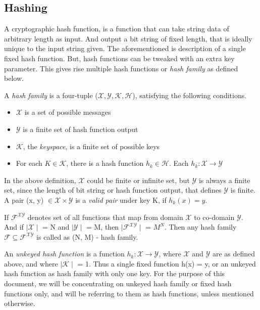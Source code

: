 \documentclass[12pt]{artikel3}                  %
\begin{document}
  \subsection{Hashing}
  A cryptographic hash function, is a function that can take string data of arbitrary length as input. 
  And output a bit string of fixed length, that is ideally unique to the input string given. The 
  aforementioned is description of a single fixed hash function. But, hash functions can be tweaked
  with an extra key parameter. This gives rise multiple hash functions or \emph{hash family} as 
  defined below.\cite{00005}

  \begin{center}
    \framebox
    {
      \parbox{420pt}
      {
        A \emph{hash family} is a four-tuple ($\mathcal{X}, \mathcal{Y}, \mathcal{K}, \mathcal{H}$),
        satisfying the following conditions.
        \begin{itemize}
          \item $\mathcal{X}$ is a set of possible messages
          \item $\mathcal{Y}$ is a finite set of hash function output
          \item $\mathcal{K}$, the \emph{keyspace}, is a finite set of possible keys
          \item For each $K \in \mathcal{K}$, there is a hash function $h_{k} \in \mathcal{H}$. Each 
            $h_{k}: \mathcal{X} \to \mathcal{Y}$ 
        \end{itemize}
      }
    }
  \end{center}
  \vspace{4mm}

  In the above definition, $\mathcal{X}$ could be finite or infinite set, but $\mathcal{Y}$ is always
  a finite set, since the length of bit string or hash function output, that defines $\mathcal{Y}$ is
  finite. A pair (x, y) $\in \mathcal{X} \times \mathcal{Y}$ is a \emph{valid pair} under key K, if 
  $h_{k}(x) = y$.

  If $\mathcal{F}^{\mathcal{X}\mathcal{Y}}$ denotes set of all functions that map from domain $\mathcal{X}$
  to co-domain $\mathcal{Y}$. And if $\mid\mathcal{X}\mid$ = N and $\mid\mathcal{Y}\mid$ = M, then 
  $\mid\mathcal{F}^{\mathcal{XY}}\mid$ = $M^{N}$. Then any hash family $\mathcal{F} \subseteq \mathcal{F}^{\mathcal{XY}}$
  is called as (N, M) - hash family.

  An \emph{unkeyed hash function} is a function $h_{k}: \mathcal{X} \to \mathcal{Y}$, where $\mathcal{X}$ and
  $\mathcal{Y}$ are as defined above, and where $\mid\mathcal{K}\mid$ = 1. Thus a single fixed function h(x) = y,
  or an unkeyed hash function as hash family with only one key. For the purpose of this document, we will
  be concentrating on unkeyed hash family or fixed hash functions only, and will be referring to them as
  hash functions, unless mentioned otherwise.
\end{document}

